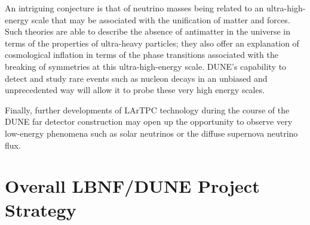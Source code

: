 
An intriguing %
conjecture is that of neutrino masses being related to an %
ultra-high-energy scale that may be associated with the unification of matter and forces. Such theories are able to describe the absence of antimatter in the universe in terms of the properties of ultra-heavy particles; they also %
offer an explanation %
of cosmological inflation in terms of the phase transitions associated with the breaking of symmetries at this ultra-high-energy scale. DUNE's capability to detect and study rare events such as nucleon decays in an unbiased and unprecedented way will allow it to probe these very high energy scales. 



Finally, further developments of LArTPC %
technology during the course of the DUNE far detector construction may open up the opportunity
to observe very low-energy phenomena such as solar neutrinos or the diffuse supernova neutrino flux.


\section{Overall LBNF/DUNE Project Strategy} %

